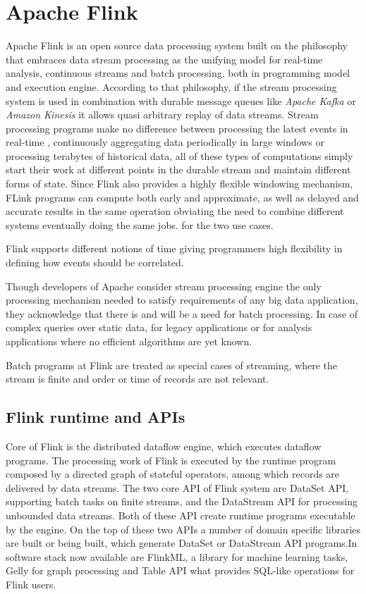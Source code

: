\section{Apache Flink}\label{flink}
Apache Flink is an open source data processing system built on the philosophy that embraces  data stream processing as the unifying model for real-time analysis, continuous streams and batch processing, both in  programming model and execution engine. 
According to that philosophy, if the stream processing system is used in combination with durable message queues like \textit{Apache Kafka} or \textit{Amazon Kinesis}  
it allows quasi arbitrary replay of data streams. Stream processing programs make no difference between processing the latest events in real-time , 
continuously aggregating data periodically in large windows or processing terabytes of historical data, all of these types of computations  simply start their work at 
different points in the durable stream and maintain different forms of state. Since Flink also provides a highly flexible windowing mechanism, 
FLink programs can compute both early and approximate, as well as delayed and accurate results in the same operation obviating the need to combine different systems eventually doing the same jobs. 
for the two use cases.

Flink supports different notions of time giving programmers high flexibility in defining how events should be correlated.

Though developers of Apache consider stream processing engine the only processing mechanism needed to satisfy requirements of any big data application, they acknowledge that there is and will be a need for batch processing. In case of complex queries over static data, for legacy applications or for analysis applications where no efficient  algorithms  are yet known.

Batch programs at Flink are treated as special cases of streaming, where the stream is finite and order or time of records are not relevant.

\subsection{Flink runtime and APIs}
Core of Flink is the distributed dataflow engine, which executes dataflow programs. The processing work of Flink is executed by the runtime program composed by a directed graph of stateful operators, among which records are delivered by data streams. The two core API of Flink system are DataSet API, supporting batch tasks on finite streams, and the DataStream API  for processing unbounded data streams. Both of these API create runtime programs executable by the engine.
On the top of these two APIs a number of domain specific libraries are built or being built, which generate DataSet or DataStream  API programs.In software stack now available are FlinkML, a library for machine learning tasks, Gelly for graph processing and Table API what provides SQL-like operations for Flink users.

